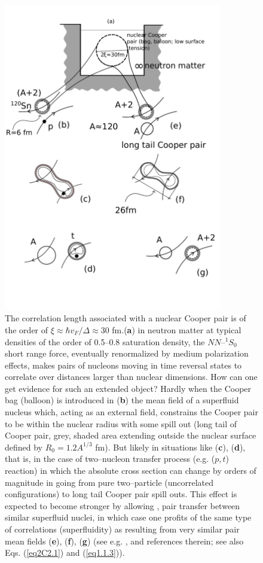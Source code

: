 \begin{figure}
	\centerline{\includegraphics*[width=0.85\textwidth,angle=0]{nutshell/figs/fig_gamma.pdf}}
\caption{The correlation length associated with a nuclear Cooper pair is of the order of $\xi\approx \hbar v_F/\Delta\approx 30 $ fm.(\textbf{a}) in neutron matter at typical densities of the order of 0.5--0.8 saturation density, the $NN$--$^{1}S_0$ short range force, eventually renormalized by medium polarization effects, makes pairs of nucleons moving in time reversal states to correlate over distances larger than nuclear dimensions. How can one get evidence for such an extended object? Hardly when the Cooper bag (balloon) is introduced in (\textbf{b}) the mean field  of a superfluid nucleus which, acting as an external field, constrains the Cooper pair to be within the nuclear radius with some spill out (long tail of Cooper pair, grey, shaded area extending outside the nuclear surface defined by $R_0=1.2A^{1/3}$ fm). But likely in situations like  (\textbf{c}), (\textbf{d}), that is,  in the case of two--nucleon transfer process (e.g. ($p,t$) reaction) in which the absolute cross section can change by orders of magnitude in going from pure two--particle (uncorrelated configurations) to long tail Cooper pair spill outs. This effect is expected to become stronger by allowing , pair transfer between similar superfluid nuclei, in which case one profits of the same type of correlations (superfluidity) as resulting from very similar pair mean fields (\textbf{e}), (\textbf{f}), (\textbf{g}) (see e.g. \cite{Oertzen:13,vonOertzen:01}, and references therein; see also Eqs. (\ref{eq2C2.1}) and (\ref{eq1.1.3})).}\label{fig_gamma}
\end{figure}
